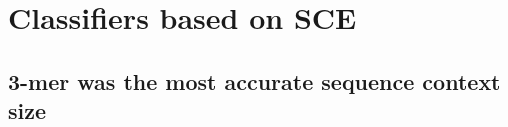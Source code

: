 

\section{Classifiers based on SCE}\label{ml:sce}

\subsection{3-mer was the most accurate sequence context size}


